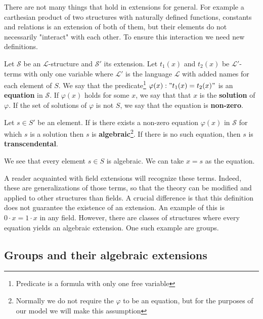 There are not many things that hold in extensions for general. For example a carthesian product of two structures with naturally defined functions, constants and relations is an extension of both of them, but their elements do not necessarily "interact" with each other. To ensure this interaction we need new definitions.

\begin{defn}
	Let $\mathcal{S}$ be an $\mathcal{L}$-structure and $\mathcal{S}'$ its extension.  Let $t_1(x)$ and $t_2(x)$ be $\mathcal{L}'$-terms with only one variable where $\mathcal{L}'$ is the language $\mathcal{L}$ with added names for each element of $S$. We say that the predicate\footnote{Predicate is a formula with only one free variable} $\varphi(x): "t_1(x)=t_2(x)"$ is an \textbf{equation} in $\mathcal{S}$. If $\varphi(x)$ holds for some $x$, we say that that $x$ is the \textbf{solution} of $\varphi$. If the set of solutions of $\varphi$ is not $S$, we say that the equation is \textbf{non-zero}.
\end{defn}
\begin{defn}	
	Let $s\in S'$ be an element. If is there exists a non-zero equation $\varphi(x)$ in $\mathcal{S}$ for which $s$ is a solution then $s$ is \textbf{algebraic}\footnote{Normally we do not require the $\varphi$ to be an equation, but for the purposes of our model we will make this assumption}. If there is no such equation, then $s$ is \textbf{transcendental}.
\end{defn}

We see that every element $s\in S$ is algebraic. We can take $x=s$ as the equation.

A reader acquainted with field extensions will recognize these terms. Indeed, these are generalizations of those terms, so that the theory can be modified and applied to other structures than fields. A crucial difference is that this definition does not guarantee the existence of an extension. An example of this is $0\cdot x=1\cdot x$ in any field. However, there are classes of structures where every equation yields an algebraic extension. One such example are groups.

\subsection{Groups and their algebraic extensions}
\label{section:groups}

